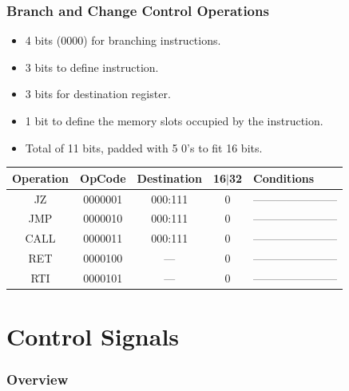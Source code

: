 \documentclass[12pt]{report}
\begin{document}
\section{Branch and Change Control Operations}
\begin{itemize}
    \item 4 bits (0000) for branching instructions.
    \item 3 bits to define instruction.
    \item 3 bits for destination register.
    \item 1 bit to define the memory slots occupied by the instruction.
    \item Total of 11 bits, padded with 5 0's to fit 16 bits. 
\end{itemize}
\begin{center}
 \begin{tabular}{||c| c| c| c| p{40mm}||} 
 \hline
 Operation & OpCode & Destination & 16$|$32 & Conditions  \\ [0.5ex] 
 \hline\hline
 JZ & 0000001 & 000:111 & 0 & ----------------------- \\
 \hline
 JMP & 0000010 & 000:111 & 0 & ----------------------- \\
 \hline
 CALL & 0000011 & 000:111 & 0 & ----------------------- \\
 \hline
 RET & 0000100 & --- & 0 & ----------------------- \\
 \hline
 RTI & 0000101 & --- & 0 & ----------------------- \\
 \hline
\end{tabular}
\end{center}

\part{Control Signals}

\section{Overview}
\end{document}
